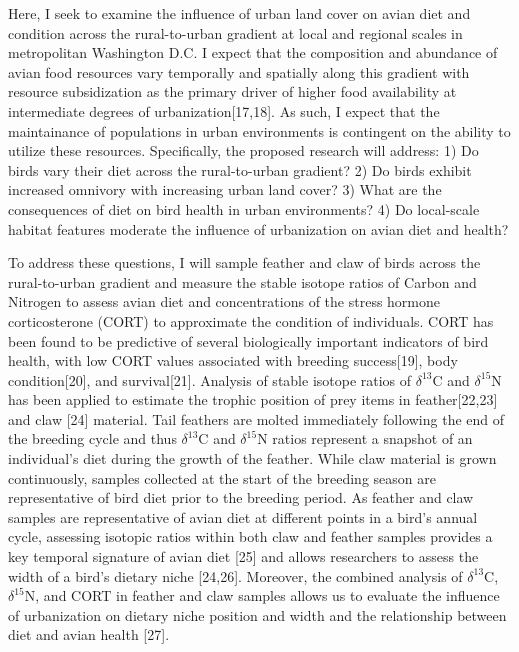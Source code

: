 \documentclass[12pt]{article}
\begin{document}

 Here, I seek to examine the influence of urban land cover on avian diet and condition across the rural-to-urban gradient at local and regional scales in metropolitan Washington D.C. I expect that the composition and abundance of avian food resources vary temporally and spatially along this gradient with resource subsidization as the primary driver of higher food availability at intermediate degrees of urbanization[17,18]. As such, I expect that the maintainance of populations in urban environments is contingent on the ability to utilize these resources. Specifically, the proposed research will address:  1) Do birds vary their diet across the rural-to-urban gradient? 2) Do birds exhibit increased omnivory with increasing urban land cover? 3) What are the consequences of diet on bird health in  urban environments? 4) Do local-scale habitat features moderate the influence of urbanization on avian diet and health? \par

To address these questions, I will sample feather and claw of birds across the rural-to-urban gradient and measure the stable isotope ratios of Carbon and Nitrogen to assess avian diet and concentrations of the stress hormone corticosterone (CORT) to approximate the condition of individuals. CORT has been found to be predictive of several biologically important indicators of bird health, with low CORT values associated with breeding success[19], body condition[20], and survival[21]. Analysis of stable isotope ratios of $\delta^{13}$C and $\delta^{15}$N has been applied to estimate the trophic position of prey items in feather[22,23] and claw [24] material. Tail feathers are molted immediately following the end of the breeding cycle and thus $\delta^{13}$C and $\delta^{15}$N ratios represent a snapshot of an individual's diet during the growth of the feather. While claw material is grown continuously, samples collected at the start of the breeding season are representative of bird diet prior to the breeding period. As feather and claw samples are representative of avian diet at different points in a bird's annual cycle, assessing isotopic ratios within both claw and feather samples provides a key temporal signature of avian diet [25] and allows researchers to assess the width of a bird's dietary niche [24,26]. Moreover, the combined analysis of $\delta^{13}$C, $\delta^{15}$N, and CORT in feather and claw samples allows us to evaluate the influence of urbanization on dietary niche position and width and the relationship between diet and avian health [27].\par
\end{document}

